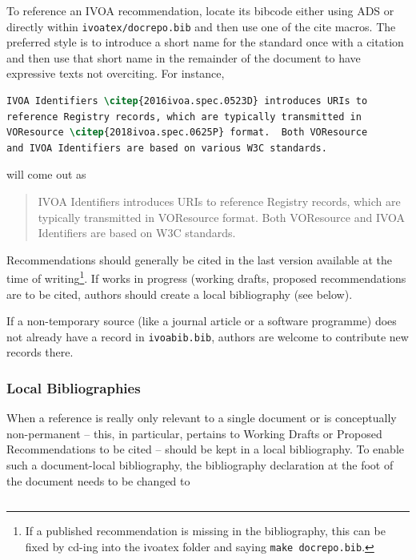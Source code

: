 \documentclass[11pt,a4paper]{ivoa}
\begin{document}
To reference an IVOA recommendation, locate its bibcode either using ADS
or directly within \texttt{ivoatex/docrepo.bib} and then use one of the
cite macros.  The preferred style is to introduce a short name for the
standard once with a citation and then use that short name in the
remainder of the document to have expressive texts not overciting. For
instance,

\begin{lstlisting}[language=tex]
IVOA Identifiers \citep{2016ivoa.spec.0523D} introduces URIs to
reference Registry records, which are typically transmitted in
VOResource \citep{2018ivoa.spec.0625P} format.  Both VOResource 
and IVOA Identifiers are based on various W3C standards.
\end{lstlisting}

will come out as

\begin{quotation}
IVOA Identifiers \citep{2016ivoa.spec.0523D} introduces URIs to
reference Registry records, which are typically transmitted in
VOResource \citep{2018ivoa.spec.0625P} format.  Both VOResource and IVOA
Identifiers are based on W3C standards.
\end{quotation}

Recommendations should generally be cited in the last version available
at the time of writing\footnote{If a published recommendation is missing
in the bibliography, this can be fixed by cd-ing into the ivoatex folder
and saying \texttt{make docrepo.bib}.}.  If works in progress (working
drafts, proposed recommendations are to be cited, authors should create
a local bibliography (see below).

If a non-temporary source (like a journal article or a software
programme) does not already have a record in \texttt{ivoabib.bib},
authors are welcome to contribute new records there.

\subsubsection{Local Bibliographies}

When a reference is really only relevant to a single document or is
conceptually non-permanent -- this, in particular, pertains to Working
Drafts or Proposed Recommendations to be cited -- should be kept in a
local bibliography.  To enable such a document-local bibliography,
the bibliography declaration at the foot of the document needs to be
changed to

\begin{lstlisting}[language=tex]

\end{lstlisting}
\end{document}
